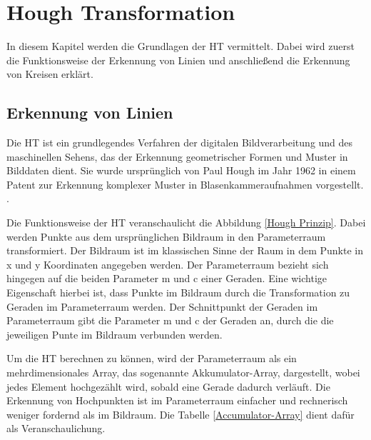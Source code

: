 \section{Hough Transformation}

In diesem Kapitel werden die Grundlagen der \ac{HT} vermittelt. Dabei wird zuerst die Funktionsweise der Erkennung von Linien und anschließend die Erkennung von Kreisen erklärt.

\label{Hough-chapter}

\subsection{Erkennung von Linien}

Die \ac{HT} ist ein grundlegendes Verfahren der digitalen Bildverarbeitung und des maschinellen Sehens, das der Erkennung geometrischer Formen und Muster in Bilddaten dient. Sie wurde ursprünglich von Paul Hough im Jahr 1962 in einem Patent zur Erkennung komplexer Muster in Blasenkammeraufnahmen vorgestellt. \cite{illingworth_survey_1988,hough_method_1962}.

Die Funktionsweise der \ac{HT} veranschaulicht die Abbildung \ref{Hough Prinzip}. Dabei werden Punkte aus dem ursprünglichen Bildraum in den Parameterraum transformiert. Der Bildraum ist im klassischen Sinne der Raum in dem Punkte in x und y Koordinaten angegeben werden. Der Parameterraum bezieht sich hingegen auf die beiden Parameter m und c einer Geraden. Eine wichtige Eigenschaft hierbei ist, dass Punkte im Bildraum durch die Transformation zu Geraden im Parameterraum werden. Der Schnittpunkt der Geraden im Parameterraum gibt die Parameter m und c der Geraden an, durch die die jeweiligen Punte im Bildraum verbunden werden. \cite{illingworth_survey_1988}

Um die \ac{HT} berechnen zu können, wird der Parameterraum als ein mehrdimensionales Array, das sogenannte Akkumulator-Array, dargestellt, wobei jedes Element hochgezählt wird, sobald eine Gerade dadurch verläuft. Die Erkennung von Hochpunkten ist im Parameterraum einfacher und rechnerisch weniger fordernd als im Bildraum. \cite{illingworth_survey_1988} Die Tabelle \ref{Accumulator-Array} dient dafür als Veranschaulichung.


